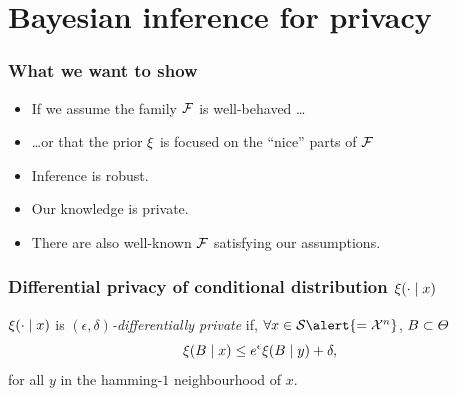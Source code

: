 \section{Bayesian inference for privacy}
\begin{frame}
  \tableofcontents[hideothersubsections]
\end{frame}


\begin{frame}
  \frametitle{What we want to show}
  \begin{itemize}
  \item<1-> If we assume the family $\mathcal{F}$ is well-behaved \ldots
  \item<1-> \ldots or that the prior $\xi$ is focused on the ``nice'' parts of $\mathcal{F}$
  \item<2-> Inference is robust.
  \item<2-> Our knowledge is private.
  \item<2-> There are also well-known $\mathcal{F}$ satisfying our assumptions.
  \end{itemize}
\end{frame}

\begin{frame}
  \frametitle{Differential privacy of conditional distribution $\xi(\cdot \mid x)$}
  \begin{definition}
    \label{def:dp-old}
    $\xi(\cdot \mid x)$ is \emph{$(\epsilon, \delta)$-differentially private} if, $\forall x \in \CS \alert{= \CX^n}$, $B \subset \Theta$
    \[
    \xi(B \mid x) \leq e^\epsilon \xi(B \mid y) + \delta,
    \]
    for all $y$ in the \alert{hamming-$1$ neighbourhood} of $x$. 
  \end{definition}
\end{frame}


